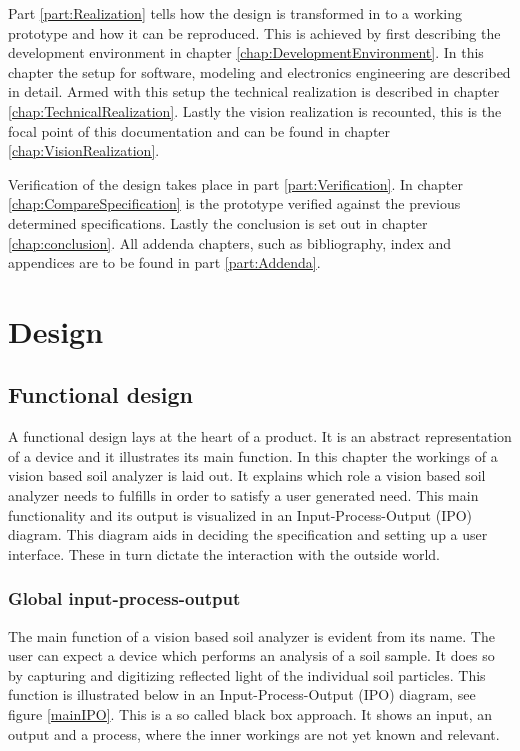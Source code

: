 \documentclass[11pt,fleqn,,a4paper,twoside,openright]{book}
\begin{document}
Part \ref{part:Realization} tells how the design is transformed in to a working prototype and how it can be reproduced. This is achieved by first describing the development environment in chapter \ref{chap:DevelopmentEnvironment}. In this chapter the setup for software, modeling and electronics engineering are described in detail. Armed with this setup the technical realization is described in chapter \ref{chap:TechnicalRealization}. Lastly the vision realization is recounted, this is the focal point of this documentation and can be found in chapter \ref{chap:VisionRealization}.

Verification of the design takes place in part \ref{part:Verification}. In chapter \ref{chap:CompareSpecification} is the prototype verified against the previous determined specifications. Lastly the conclusion is set out in chapter \ref{chap:conclusion}. All addenda chapters, such as bibliography, index and appendices are to be found in part \ref{part:Addenda}.

\part{Design}\label{part:Design}

\chapter{Functional design}\label{chap:FunctionalDesiging}
A functional design lays at the heart of a product. It is an abstract representation of a device and it illustrates its main function. In this chapter the workings of a vision based soil analyzer is laid out. It explains which role a vision based soil analyzer needs to fulfills in order to satisfy a user generated need. This main functionality and its output is visualized in an Input-Process-Output (IPO) diagram. This diagram aids in deciding the specification and setting up a user interface. These in turn dictate the interaction with the outside world.

\section{Global input-process-output}
The main function of a vision based soil analyzer is evident from its name. The user can expect a device which performs an analysis of a soil sample. It does so by capturing and digitizing reflected light of the individual soil particles. This function is illustrated below in an Input-Process-Output (IPO) diagram, see figure \ref{mainIPO}. This is a so called black box approach. It shows an input, an output and a process, where the inner workings are not yet known and relevant.
\end{document}
